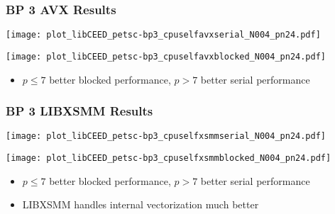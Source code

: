 \documentclass{beamer}
\begin{document}

\begin{frame}
\begin{center}
\frametitle{BP 3 AVX Results}

\begin{multicols}{2}

\begin{flushleft}
\texttt{[image: plot\_libCEED\_petsc-bp3\_cpuselfavxserial\_N004\_pn24.pdf]}
\end{flushleft}

\begin{flushright}
\texttt{[image: plot\_libCEED\_petsc-bp3\_cpuselfavxblocked\_N004\_pn24.pdf]}
\end{flushright}

\end{multicols}

\vspace{-0.15cm}

\begin{itemize}

\item $p \leq 7$ better blocked performance, $p > 7$ better serial performance

\end{itemize}

\end{center}
\end{frame}


\begin{frame}
\begin{center}
\frametitle{BP 3 LIBXSMM Results}

\begin{multicols}{2}

\begin{flushleft}
\texttt{[image: plot\_libCEED\_petsc-bp3\_cpuselfxsmmserial\_N004\_pn24.pdf]}
\end{flushleft}

\begin{flushright}
\texttt{[image: plot\_libCEED\_petsc-bp3\_cpuselfxsmmblocked\_N004\_pn24.pdf]}
\end{flushright}

\end{multicols}

\vspace{-0.5cm}

\begin{itemize}

\item $p \leq 7$ better blocked performance, $p > 7$ better serial performance

\item LIBXSMM handles internal vectorization much better

\end{itemize}

\end{center}
\end{frame}
\end{document}

